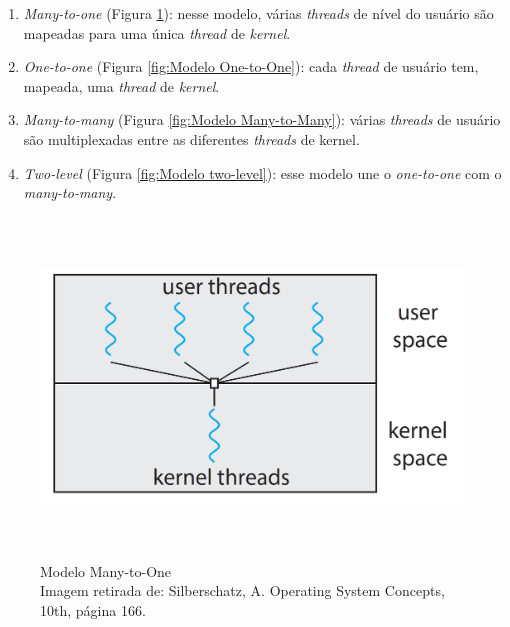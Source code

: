 \begin{enumerate}
\def\labelenumi{\arabic{enumi}.}

\item
  \emph{Many-to-one} (Figura \ref{fig:Modelo Many-to-One}): nesse modelo, várias \emph{threads} de nível do
  usuário são mapeadas para uma única \emph{thread} de \emph{kernel}.
\item
  \emph{One-to-one} (Figura \ref{fig:Modelo One-to-One}): cada \emph{thread} de usuário tem, mapeada, uma
  \emph{thread} de \emph{kernel}.
\item
  \emph{Many-to-many} (Figura \ref{fig:Modelo Many-to-Many}): várias \emph{threads} de usuário são
  multiplexadas entre as diferentes \emph{threads} de kernel.
\item
  \emph{Two-level} (Figura \ref{fig:Modelo two-level}): esse modelo une o \emph{one-to-one} com o
  \emph{many-to-many}.
\end{enumerate}



\begin{figure}[h!]
\centering
\includegraphics[keepaspectratio, width=12cm, height=9cm]{imagens/06/06 - many-to-one.png}
\caption{Modelo Many-to-One   \\
Imagem retirada de: Silberschatz, A. Operating System Concepts, 10th,
página 166. \\}
\label{fig:Modelo Many-to-One}
\end{figure}

